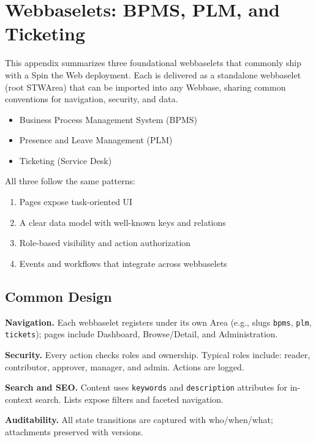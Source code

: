 
\chapter{Webbaselets: BPMS, PLM, and Ticketing}
\label{app:webbaselets}

This appendix summarizes three foundational webbaselets that commonly ship with a Spin the Web deployment. Each is delivered as a standalone webbaselet (root STWArea) that can be imported into any Webbase, sharing common conventions for navigation, security, and data.

\begin{itemize}
  \item Business Process Management System (BPMS)
  \item Presence and Leave Management (PLM)
  \item Ticketing (Service Desk)
\end{itemize}

All three follow the same patterns:
\begin{enumerate}
  \item Pages expose task-oriented UI
  \item A clear data model with well-known keys and relations
  \item Role-based visibility and action authorization
  \item Events and workflows that integrate across webbaselets
\end{enumerate}

\section{Common Design}
\label{sec:app-webbaselets-common}

\textbf{Navigation.} Each webbaselet registers under its own Area (e.g., slugs \texttt{bpms}, \texttt{plm}, \texttt{tickets}); pages include Dashboard, Browse/Detail, and Administration.

\textbf{Security.} Every action checks roles and ownership. Typical roles include: reader, contributor, approver, manager, and admin. Actions are logged.

\textbf{Search and SEO.} Content uses \texttt{keywords} and \texttt{description} attributes for in-context search. Lists expose filters and faceted navigation.

\textbf{Auditability.} All state transitions are captured with who/when/what; attachments preserved with versions.

